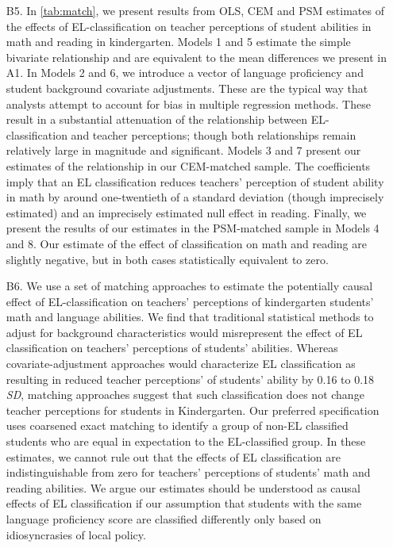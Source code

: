 \documentclass[a4paper, 11pt]{article}
\begin{document}
\begin{enumerate}
	\item[B5.] In \autoref{tab:match}, we present results from OLS, CEM and PSM estimates of the effects of EL-classification on teacher perceptions of student abilities in math and reading in kindergarten. Models 1 and 5 estimate the simple bivariate relationship and are equivalent to the mean differences we present in A1. In Models 2 and 6, we introduce a vector of language proficiency and student background covariate adjustments. These are the typical way that analysts attempt to account for bias in multiple regression methods. These result in a substantial attenuation of the relationship between EL-classification and teacher perceptions; though both relationships remain relatively large in magnitude and significant. Models 3 and 7 present our estimates of the relationship in our CEM-matched sample. The coefficients imply that an EL classification reduces teachers' perception of student ability in math by around one-twentieth of a standard deviation (though imprecisely estimated) and an imprecisely estimated null effect in reading. Finally, we present the results of our estimates in the PSM-matched sample in Models 4 and 8. Our estimate of the effect of classification on math and reading are slightly negative, but in both cases statistically equivalent to zero.

	\item[B6.] We use a set of matching approaches to estimate the potentially causal effect of EL-classification on teachers' perceptions of kindergarten students' math and language abilities. We find that traditional statistical methods to adjust for background characteristics would misrepresent the effect of EL classification on teachers' perceptions of students' abilities. Whereas covariate-adjustment approaches would characterize EL classification as resulting in reduced teacher perceptions' of students' ability by 0.16 to 0.18 \textit{SD}, matching approaches suggest that such classification does not change teacher perceptions for students in Kindergarten. Our preferred specification uses coarsened exact matching to identify a group of non-EL classified students who are equal in expectation to the EL-classified group. In these estimates, we cannot rule out that the effects of EL classification are indistinguishable from zero for teachers' perceptions of students' math and reading abilities. We argue our estimates should be understood as causal effects of EL classification if our assumption that students with the same language proficiency score are classified differently only based on idiosyncrasies of local policy. 
	
\end{enumerate}

\begin{landscape}

\end{landscape}
\end{document}
